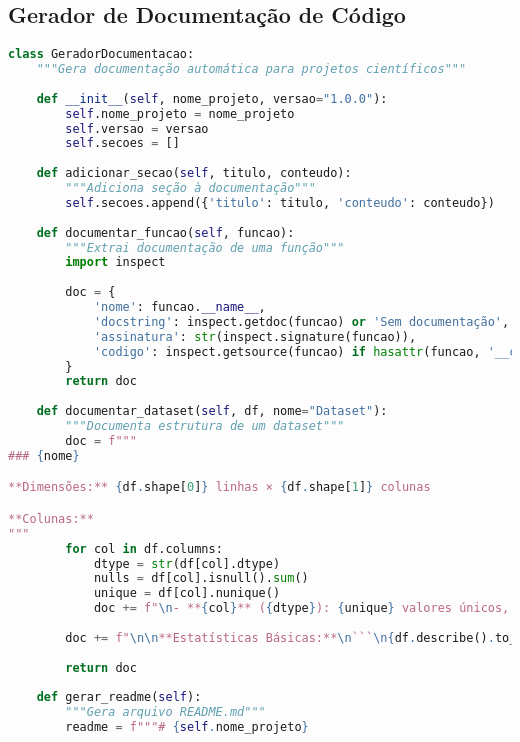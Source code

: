 \subsection{Gerador de Documentação de Código}

\begin{pythonbox}
\begin{lstlisting}[language=Python]
class GeradorDocumentacao:
    """Gera documentação automática para projetos científicos"""
    
    def __init__(self, nome_projeto, versao="1.0.0"):
        self.nome_projeto = nome_projeto
        self.versao = versao
        self.secoes = []
        
    def adicionar_secao(self, titulo, conteudo):
        """Adiciona seção à documentação"""
        self.secoes.append({'titulo': titulo, 'conteudo': conteudo})
    
    def documentar_funcao(self, funcao):
        """Extrai documentação de uma função"""
        import inspect
        
        doc = {
            'nome': funcao.__name__,
            'docstring': inspect.getdoc(funcao) or 'Sem documentação',
            'assinatura': str(inspect.signature(funcao)),
            'codigo': inspect.getsource(funcao) if hasattr(funcao, '__code__') else 'N/A'
        }
        return doc
    
    def documentar_dataset(self, df, nome="Dataset"):
        """Documenta estrutura de um dataset"""
        doc = f"""
### {nome}

**Dimensões:** {df.shape[0]} linhas × {df.shape[1]} colunas

**Colunas:**
"""
        for col in df.columns:
            dtype = str(df[col].dtype)
            nulls = df[col].isnull().sum()
            unique = df[col].nunique()
            doc += f"\n- **{col}** ({dtype}): {unique} valores únicos, {nulls} valores nulos"
        
        doc += f"\n\n**Estatísticas Básicas:**\n```\n{df.describe().to_string()}\n```"
        
        return doc
    
    def gerar_readme(self):
        """Gera arquivo README.md"""
        readme = f"""# {self.nome_projeto}
   \end{lstlisting}
\end{pythonbox}

